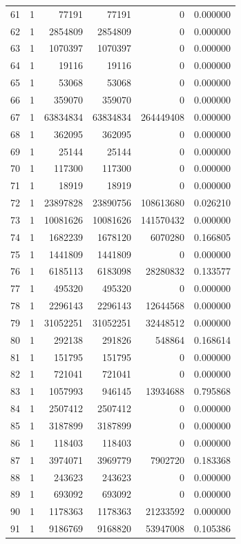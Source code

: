\begin{longtable}{rrrrrr}
61 & 1 & 77191 & 77191 & 0 & 0.000000\\
62 & 1 & 2854809 & 2854809 & 0 & 0.000000\\
63 & 1 & 1070397 & 1070397 & 0 & 0.000000\\
64 & 1 & 19116 & 19116 & 0 & 0.000000\\
65 & 1 & 53068 & 53068 & 0 & 0.000000\\
66 & 1 & 359070 & 359070 & 0 & 0.000000\\
67 & 1 & 63834834 & 63834834 & 264449408 & 0.000000\\
68 & 1 & 362095 & 362095 & 0 & 0.000000\\
69 & 1 & 25144 & 25144 & 0 & 0.000000\\
70 & 1 & 117300 & 117300 & 0 & 0.000000\\
71 & 1 & 18919 & 18919 & 0 & 0.000000\\
72 & 1 & 23897828 & 23890756 & 108613680 & 0.026210\\
73 & 1 & 10081626 & 10081626 & 141570432 & 0.000000\\
74 & 1 & 1682239 & 1678120 & 6070280 & 0.166805\\
75 & 1 & 1441809 & 1441809 & 0 & 0.000000\\
76 & 1 & 6185113 & 6183098 & 28280832 & 0.133577\\
77 & 1 & 495320 & 495320 & 0 & 0.000000\\
78 & 1 & 2296143 & 2296143 & 12644568 & 0.000000\\
79 & 1 & 31052251 & 31052251 & 32448512 & 0.000000\\
80 & 1 & 292138 & 291826 & 548864 & 0.168614\\
81 & 1 & 151795 & 151795 & 0 & 0.000000\\
82 & 1 & 721041 & 721041 & 0 & 0.000000\\
83 & 1 & 1057993 & 946145 & 13934688 & 0.795868\\
84 & 1 & 2507412 & 2507412 & 0 & 0.000000\\
85 & 1 & 3187899 & 3187899 & 0 & 0.000000\\
86 & 1 & 118403 & 118403 & 0 & 0.000000\\
87 & 1 & 3974071 & 3969779 & 7902720 & 0.183368\\
88 & 1 & 243623 & 243623 & 0 & 0.000000\\
89 & 1 & 693092 & 693092 & 0 & 0.000000\\
90 & 1 & 1178363 & 1178363 & 21233592 & 0.000000\\
91 & 1 & 9186769 & 9168820 & 53947008 & 0.105386\\

\end{longtable}
